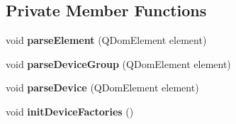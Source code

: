 \subsection*{Private Member Functions}
\begin{DoxyCompactItemize}
\item 
\hypertarget{classdrobot_1_1robot_1_1Robot_aaf3e6c071cde549bfdbb493ef0893af8}{void {\bfseries parse\-Element} (Q\-Dom\-Element element)}\label{classdrobot_1_1robot_1_1Robot_aaf3e6c071cde549bfdbb493ef0893af8}

\item 
\hypertarget{classdrobot_1_1robot_1_1Robot_a08c5f6468f7a655c8d5e06ffa1248cae}{void {\bfseries parse\-Device\-Group} (Q\-Dom\-Element element)}\label{classdrobot_1_1robot_1_1Robot_a08c5f6468f7a655c8d5e06ffa1248cae}

\item 
\hypertarget{classdrobot_1_1robot_1_1Robot_ab9bc0cc2a3e31f026024659ad3d17dd1}{void {\bfseries parse\-Device} (Q\-Dom\-Element element)}\label{classdrobot_1_1robot_1_1Robot_ab9bc0cc2a3e31f026024659ad3d17dd1}

\item 
\hypertarget{classdrobot_1_1robot_1_1Robot_a8d23bb468226543b43ff9bb298b5fe91}{void {\bfseries init\-Device\-Factories} ()}\label{classdrobot_1_1robot_1_1Robot_a8d23bb468226543b43ff9bb298b5fe91}

\end{DoxyCompactItemize}

